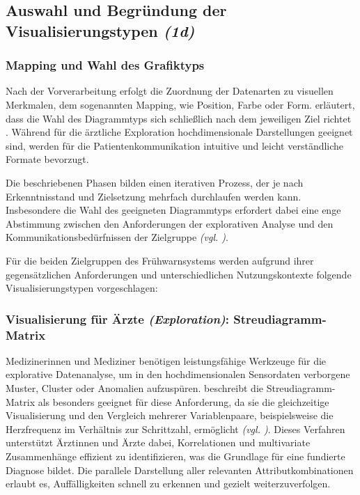 
\subsection{Auswahl und Begründung der Visualisierungstypen \textit{(1d)}}
\label{sec:1d}

\subsubsection{Mapping und Wahl des Grafiktyps}

Nach der Vorverarbeitung erfolgt die Zuordnung der Datenarten zu visuellen Merkmalen, dem sogenannten Mapping, wie Position, Farbe oder Form. \citeauthor{1} erläutert, dass die Wahl des Diagrammtyps sich schließlich nach dem jeweiligen Ziel richtet \cite[31, 35]{1}. Während für die ärztliche Exploration hochdimensionale Darstellungen geeignet sind, werden für die Patientenkommunikation intuitive und leicht verständliche Formate bevorzugt.

Die beschriebenen Phasen bilden einen iterativen Prozess, der je nach Erkenntnisstand und Zielsetzung mehrfach durchlaufen werden kann. Insbesondere die Wahl des geeigneten Diagrammtyps erfordert dabei eine enge Abstimmung zwischen den Anforderungen der explorativen Analyse und den Kommunikationsbedürfnissen der Zielgruppe \textit{(\acs{vgl.} \cite[8]{2})}.

Für die beiden Zielgruppen des Frühwarnsystems werden aufgrund ihrer gegensätzlichen Anforderungen und unterschiedlichen Nutzungskontexte folgende Visualisierungstypen vorgeschlagen:

\subsubsection{Visualisierung für Ärzte \textit{(Exploration)}: Streudiagramm-Matrix}

Medizinerinnen und Mediziner benötigen leistungsfähige Werkzeuge für die explorative Datenanalyse, um in den hochdimensionalen Sensordaten verborgene Muster, Cluster oder Anomalien aufzuspüren. \citeauthor{1} beschreibt die Streudiagramm-Matrix als besonders geeignet für diese Anforderung, da sie die gleichzeitige Visualisierung und den Vergleich mehrerer Variablenpaare, beispielsweise die Herzfrequenz im Verhältnis zur Schrittzahl, ermöglicht \textit{(\acs{vgl.} \cite[39]{1})}. Dieses Verfahren unterstützt Ärztinnen und Ärzte dabei, Korrelationen und multivariate Zusammenhänge effizient zu identifizieren, was die Grundlage für eine fundierte Diagnose bildet. Die parallele Darstellung aller relevanten Attributkombinationen erlaubt es, Auffälligkeiten schnell zu erkennen und gezielt weiterzuverfolgen.

